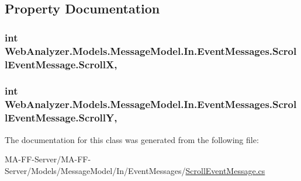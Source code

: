 \subsection{Property Documentation}
\hypertarget{class_web_analyzer_1_1_models_1_1_message_model_1_1_in_1_1_event_messages_1_1_scroll_event_message_a4cee20f8724b3bff5aeca63bc6f3ac83}{}
\subsubsection[{Scroll\+X}]{\setlength{\rightskip}{0pt plus 5cm}int Web\+Analyzer.\+Models.\+Message\+Model.\+In.\+Event\+Messages.\+Scroll\+Event\+Message.\+Scroll\+X\hspace{0.3cm}{\ttfamily [get]}, {\ttfamily [set]}}\label{class_web_analyzer_1_1_models_1_1_message_model_1_1_in_1_1_event_messages_1_1_scroll_event_message_a4cee20f8724b3bff5aeca63bc6f3ac83}
\hypertarget{class_web_analyzer_1_1_models_1_1_message_model_1_1_in_1_1_event_messages_1_1_scroll_event_message_ab7c3211d465e80a5d8f1cf40a0a690ff}{}
\subsubsection[{Scroll\+Y}]{\setlength{\rightskip}{0pt plus 5cm}int Web\+Analyzer.\+Models.\+Message\+Model.\+In.\+Event\+Messages.\+Scroll\+Event\+Message.\+Scroll\+Y\hspace{0.3cm}{\ttfamily [get]}, {\ttfamily [set]}}\label{class_web_analyzer_1_1_models_1_1_message_model_1_1_in_1_1_event_messages_1_1_scroll_event_message_ab7c3211d465e80a5d8f1cf40a0a690ff}


The documentation for this class was generated from the following file\+:\begin{DoxyCompactItemize}
\item 
M\+A-\/\+F\+F-\/\+Server/\+M\+A-\/\+F\+F-\/\+Server/\+Models/\+Message\+Model/\+In/\+Event\+Messages/\hyperlink{_scroll_event_message_8cs}{Scroll\+Event\+Message.\+cs}\end{DoxyCompactItemize}
